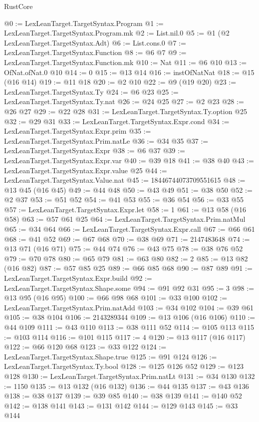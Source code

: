 \begin{lexlean}{RustCore}
\begin{coremodule}
@0 := LexLeanTarget.TargetSyntax.Program
@1 := LexLeanTarget.TargetSyntax.Program.mk
@2 := List.nil.{0}
@5 := @1 (@2 LexLeanTarget.TargetSyntax.Adt)
@6 := List.cons.{0}
@7 := LexLeanTarget.TargetSyntax.Function
@8 := @6 @7
@9 := LexLeanTarget.TargetSyntax.Function.mk
@10 := Nat
@11 := @6 @10
@13 := OfNat.ofNat.{0} @10
@14 := 0
@15 := @13 @14
@16 := instOfNatNat
@18 := @15 (@16 @14)
@19 := @11 @18
@20 := @2 @10
@22 := @9 (@19 @20)
@23 := LexLeanTarget.TargetSyntax.Ty
@24 := @6 @23
@25 := LexLeanTarget.TargetSyntax.Ty.nat
@26 := @24 @25
@27 := @2 @23
@28 := @26 @27
@29 := @22 @28
@31 := LexLeanTarget.TargetSyntax.Ty.option @25
@32 := @29 @31
@33 := LexLeanTarget.TargetSyntax.Expr.cond
@34 := LexLeanTarget.TargetSyntax.Expr.prim
@35 := LexLeanTarget.TargetSyntax.Prim.natLe
@36 := @34 @35
@37 := LexLeanTarget.TargetSyntax.Expr
@38 := @6 @37
@39 := LexLeanTarget.TargetSyntax.Expr.var
@40 := @39 @18
@41 := @38 @40
@43 := LexLeanTarget.TargetSyntax.Expr.value @25
@44 := LexLeanTarget.TargetSyntax.Value.nat
@45 := 18446744073709551615
@48 := @13 @45 (@16 @45)
@49 := @44 @48
@50 := @43 @49
@51 := @38 @50
@52 := @2 @37
@53 := @51 @52
@54 := @41 @53
@55 := @36 @54
@56 := @33 @55
@57 := LexLeanTarget.TargetSyntax.Expr.let
@58 := 1
@61 := @13 @58 (@16 @58)
@63 := @57 @61 @25
@64 := LexLeanTarget.TargetSyntax.Prim.natMul
@65 := @34 @64
@66 := LexLeanTarget.TargetSyntax.Expr.call
@67 := @66 @61
@68 := @41 @52
@69 := @67 @68
@70 := @38 @69
@71 := 2147483648
@74 := @13 @71 (@16 @71)
@75 := @44 @74
@76 := @43 @75
@78 := @38 @76 @52
@79 := @70 @78
@80 := @65 @79
@81 := @63 @80
@82 := 2
@85 := @13 @82 (@16 @82)
@87 := @57 @85 @25
@89 := @66 @85 @68
@90 := @87 @89
@91 := LexLeanTarget.TargetSyntax.Expr.build
@92 := LexLeanTarget.TargetSyntax.Shape.some
@94 := @91 @92 @31
@95 := 3
@98 := @13 @95 (@16 @95)
@100 := @66 @98 @68
@101 := @33 @100
@102 := LexLeanTarget.TargetSyntax.Prim.natAdd
@103 := @34 @102
@104 := @39 @61
@105 := @38 @104
@106 := 2143289344
@109 := @13 @106 (@16 @106)
@110 := @44 @109
@111 := @43 @110
@113 := @38 @111 @52
@114 := @105 @113
@115 := @103 @114
@116 := @101 @115
@117 := 4
@120 := @13 @117 (@16 @117)
@122 := @66 @120 @68
@123 := @33 @122
@124 := LexLeanTarget.TargetSyntax.Shape.true
@125 := @91 @124
@126 := LexLeanTarget.TargetSyntax.Ty.bool
@128 := @125 @126 @52
@129 := @123 @128
@130 := LexLeanTarget.TargetSyntax.Prim.natLt
@131 := @34 @130
@132 := 1150
@135 := @13 @132 (@16 @132)
@136 := @44 @135
@137 := @43 @136
@138 := @38 @137
@139 := @39 @85
@140 := @38 @139
@141 := @140 @52
@142 := @138 @141
@143 := @131 @142
@144 := @129 @143
@145 := @33 @144

\end{coremodule}
\end{lexlean}
